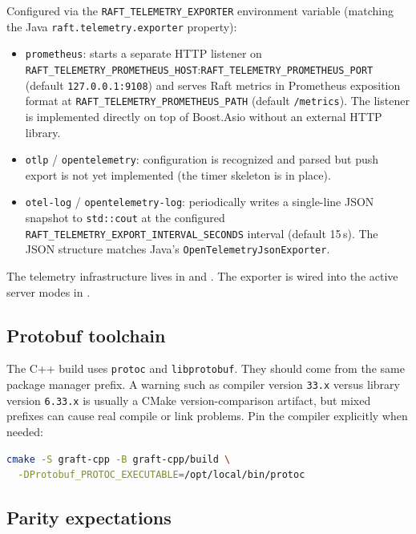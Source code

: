 Configured via the \texttt{RAFT\_TELEMETRY\_EXPORTER} environment variable
(matching the Java \texttt{raft.telemetry.exporter} property):

\begin{itemize}
\item \texttt{prometheus}: starts a separate HTTP listener on
  \texttt{RAFT\_TELEMETRY\_PROMETHEUS\_HOST}:\texttt{RAFT\_TELEMETRY\_PROMETHEUS\_PORT}
  (default \texttt{127.0.0.1:9108}) and serves Raft metrics in Prometheus
  exposition format at \texttt{RAFT\_TELEMETRY\_PROMETHEUS\_PATH} (default
  \texttt{/metrics}). The listener is implemented directly on top of Boost.Asio
  without an external HTTP library.

\item \texttt{otlp} / \texttt{opentelemetry}: configuration is recognized and
  parsed but push export is not yet implemented (the timer skeleton is in
  place).

\item \texttt{otel-log} / \texttt{opentelemetry-log}: periodically writes a
  single-line JSON snapshot to \texttt{std::cout} at the configured
  \texttt{RAFT\_TELEMETRY\_EXPORT\_INTERVAL\_SECONDS} interval (default 15\,s).
  The JSON structure matches Java's \texttt{OpenTelemetryJsonExporter}.
\end{itemize}

The telemetry infrastructure lives in
 and
. The exporter is wired into
the active server modes in .

\subsection{Protobuf toolchain}

The C++ build uses \texttt{protoc} and \texttt{libprotobuf}. They should come
from the same package manager prefix. A warning such as compiler version
\texttt{33.x} versus library version \texttt{6.33.x} is usually a CMake
version-comparison artifact, but mixed prefixes can cause real compile or link
problems. Pin the compiler explicitly when needed:

\begin{lstlisting}[language=bash,caption={Pinning protoc}]
cmake -S graft-cpp -B graft-cpp/build \
  -DProtobuf_PROTOC_EXECUTABLE=/opt/local/bin/protoc
\end{lstlisting}

\subsection{Parity expectations}


